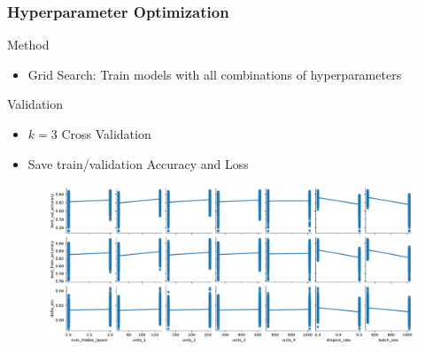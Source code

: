 \documentclass[8pt]{beamer}
\begin{document}
\begin{frame}
    \frametitle{Hyperparameter Optimization}
    \begin{alertblock}{Method}
        \begin{itemize}
            \item Grid Search: Train models with all combinations of hyperparameters
        \end{itemize}
    \end{alertblock}
    \begin{alertblock}{Validation}
        \begin{itemize}
            \item $k=\num{3}$ Cross Validation
            \item Save train/validation Accuracy and Loss
        \end{itemize}
    \end{alertblock}
    \begin{figure}
        \includegraphics[scale=0.3]{figures/HPO_parameter.pdf}
    \end{figure}
\end{frame}
\end{document}
